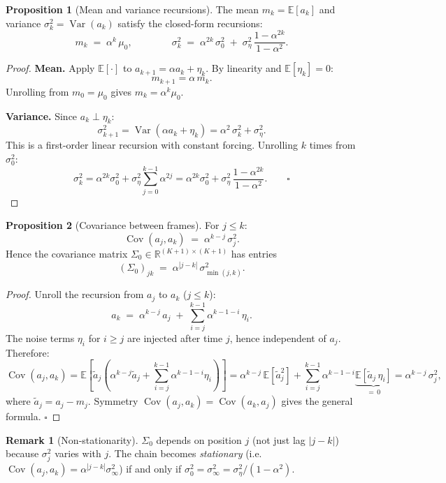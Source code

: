 \documentclass[12pt, a4paper]{article}
\theoremstyle{definition}
\newtheorem{proposition}{Proposition}[section]
\newtheorem{remark}{Remark}[section]
\newcommand{\R}{\mathbb{R}}
\newcommand{\E}{\mathbb{E}}
\newcommand{\Var}{\operatorname{Var}}
\newcommand{\Cov}{\operatorname{Cov}}
\begin{document}
\begin{proposition}[Mean and variance recursions]\label{prop:moments}
The mean $m_k = \E[a_k]$ and variance $\sigma_k^2 = \Var(a_k)$ satisfy
the closed-form recursions:
\[
  m_k \;=\; \alpha^k\,\mu_0,
  \qquad\qquad
  \sigma_k^2 \;=\; \alpha^{2k}\,\sigma_0^2
  \;+\; \sigma_\eta^2\,\frac{1 - \alpha^{2k}}{1 - \alpha^2}.
\]
\end{proposition}

\begin{proof}
\textbf{Mean.} Apply $\E[\cdot]$ to $a_{k+1} = \alpha a_k + \eta_k$.
By linearity and $\E[\eta_k]=0$:
\[
  m_{k+1} = \alpha\,m_k.
\]
Unrolling from $m_0 = \mu_0$ gives $m_k = \alpha^k\mu_0$.

\textbf{Variance.} Since $a_k \perp \eta_k$:
\[
  \sigma_{k+1}^2
  = \Var(\alpha a_k + \eta_k)
  = \alpha^2\,\sigma_k^2 + \sigma_\eta^2.
\]
This is a first-order linear recursion with constant forcing.
Unrolling $k$ times from $\sigma_0^2$:
\[
  \sigma_k^2
  = \alpha^{2k}\sigma_0^2
  + \sigma_\eta^2\sum_{j=0}^{k-1}\alpha^{2j}
  = \alpha^{2k}\sigma_0^2
  + \sigma_\eta^2\,\frac{1-\alpha^{2k}}{1-\alpha^2}. \qquad\square
\]
\end{proof}

\begin{proposition}[Covariance between frames]\label{prop:cov}
For $j \leq k$:
\[
  \Cov(a_j, a_k) \;=\; \alpha^{k-j}\,\sigma_j^2.
\]
Hence the covariance matrix $\Sigma_0 \in \R^{(K+1)\times(K+1)}$ has
entries
\[
  (\Sigma_0)_{jk} \;=\; \alpha^{|j-k|}\,\sigma_{\min(j,k)}^2.
\]
\end{proposition}

\begin{proof}
Unroll the recursion from $a_j$ to $a_k$ ($j \leq k$):
\[
  a_k \;=\; \alpha^{k-j}\,a_j \;+\; \sum_{i=j}^{k-1}\alpha^{k-1-i}\,\eta_i.
\]
The noise terms $\eta_i$ for $i \geq j$ are injected after time $j$, hence
independent of $a_j$. Therefore:
\[
  \Cov(a_j, a_k)
  = \E\!\left[\tilde{a}_j\!\left(\alpha^{k-j}\tilde{a}_j
    + \sum_{i=j}^{k-1}\alpha^{k-1-i}\eta_i\right)\right]
  = \alpha^{k-j}\,\E[\tilde{a}_j^2]
  + \sum_{i=j}^{k-1}\alpha^{k-1-i}\underbrace{\E[\tilde{a}_j\,\eta_i]}_{=\,0}
  = \alpha^{k-j}\,\sigma_j^2,
\]
where $\tilde{a}_j = a_j - m_j$. Symmetry $\Cov(a_j,a_k)=\Cov(a_k,a_j)$
gives the general formula. \qquad$\square$
\end{proof}

\begin{remark}[Non-stationarity]
$\Sigma_0$ depends on position $j$ (not just lag $|j-k|$) because
$\sigma_j^2$ varies with $j$. The chain becomes \emph{stationary}
(i.e.\ $\Cov(a_j,a_k) = \alpha^{|j-k|}\sigma_\infty^2$) if and only if
$\sigma_0^2 = \sigma_\infty^2 = \sigma_\eta^2/(1-\alpha^2)$.
\end{remark}
\end{document}
